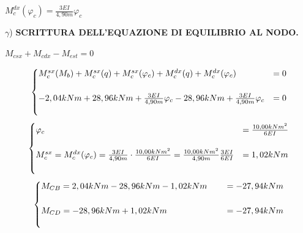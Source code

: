 \documentclass[a4paper,12pt, oneside]{book}
\newenvironment{tightcenter}{%
	\setlength\topsep{0pt}
	\setlength\parskip{0pt}
	\begin{center}
	}{%
	\end{center}
}
\begin{document}
    \begin{tightcenter}
    $M_{c}^{dx}(\varphi_{c})=\frac{3EI}{4,90m}\varphi_{c}$
    \end{tightcenter}
    \leavevmode\newline
    \leavevmode\newline
    \leavevmode\newline
    $\gamma$) \textbf{SCRITTURA DELL'EQUAZIONE DI EQUILIBRIO AL NODO.} 
    \leavevmode\newline
    \leavevmode\newline
    \begin{tightcenter}
      $ M_{csx}+M_{cdx}-M_{est}=0  $
    \end{tightcenter}
    \leavevmode\newline 
    \begin{equation}
    	\begin{cases}
    		M_{c}^{sx}(M_b)+M_{c}^{sx}(q)+M_{c}^{sx}(\varphi_{c})+M_{c}^{dx}(q)+M_{c}^{dx}(\varphi_{c})&=0 \\ \\
    		-2,04kNm+28,96kNm+\frac{3EI}{4,90m}\varphi_{c}-28,96kNm+\frac{3EI}{4,90m}\varphi_{c}&=0\\ \\ 
    	\end{cases}
    	\hfill
    \end{equation}
   \leavevmode\newline
    \begin{equation}
    	\begin{cases}
    		\varphi_{c}&=\frac{10,00kNm^{2}}{6EI}\\ \\
    		M_{c}^{sx}=M_{c}^{dx}(\varphi_{c})=\frac{3EI}{4,90m}\cdot\frac{10,00kNm^{2}}{6EI}=\frac{10,00kNm^{2}}{4,90m}\frac{3EI}{6EI}&=1,02kNm\\ \\ 
    	\end{cases}
    	\hfill
    \end{equation}
    \leavevmode\newline
    \begin{equation}
    	\begin{cases}
    		M_{CB}=2,04kNm-28,96kNm-1,02kNm\phantom{tes}&=-27,94kNm \\ \\
    		M_{CD}=-28,96kNm+1,02kNm\phantom{tes}&=-27,94kNm\\ \\ 
    	\end{cases}
    	\hfill
    \end{equation}
\end{document}
